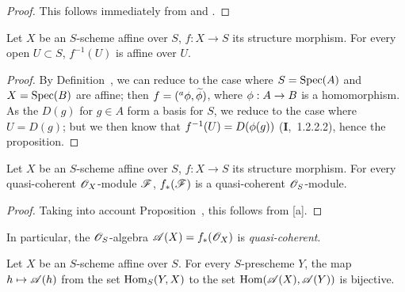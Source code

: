 \begin{proof}
\label{proof-2.1.2.4}
This follows immediately from  and .
\end{proof}

\begin{proposition}[1.2.5]
\label{2.1.2.5}
Let $X$ be an $S$-scheme affine over $S$, $f:X\to S$ its structure morphism.
For every open $U\subset S$, $f^{-1}(U)$ is affine over $U$.
\end{proposition}

\begin{proof}
\label{proof-2.1.2.5}
By Definition~, we can reduce to the case where $S=\operatorname{Spec}(A)$ and $X=\operatorname{Spec}(B)$ are affine; then $f=({}^a\phi,\widetilde{\phi})$, where $\vphi:A\to B$ is a homomorphism.
As the $D(g)$ for $g\in A$ form a basis for $S$, we reduce to the case where $U=D(g)$; but we then know that $f^{-1}(U)=D(\phi(g))$ (\textbf{I},~1.2.2.2), hence the proposition.
\end{proof}

\begin{proposition}[1.2.6]
\label{2.1.2.6}
Let $X$ be an $S$-scheme affine over $S$, $f:X\to S$ its structure morphism.
For every quasi-coherent $\mathscr{O}_X$-module $\mathscr{F}$, $f_*(\mathscr{F})$ is a quasi-coherent $\mathscr{O}_S$-module.
\end{proposition}

\begin{proof}
\label{proof-2.1.2.6}
Taking into account Proposition~, this follows from [a].
\end{proof}

In particular, the $\mathscr{O}_S$-algebra $\mathscr{A}(X)=f_*(\mathscr{O}_X)$ is \emph{quasi-coherent}.

\begin{proposition}[1.2.7]
\label{2.1.2.7}
Let $X$ be an $S$-scheme affine over $S$.
For every $S$-prescheme $Y$, the map $h\mapsto\sh{A}(h)$ from the set $\operatorname{Hom}_S(Y,X)$ to the set $\operatorname{Hom}(\mathscr{A}(X),\mathscr{A}(Y))$  is bijective.
\end{proposition}

